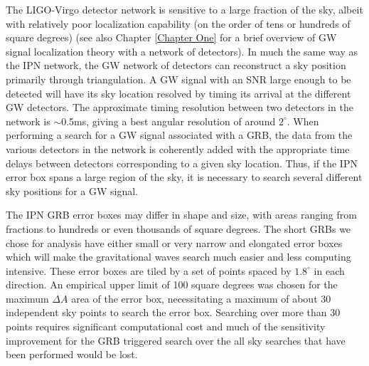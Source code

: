 The LIGO-Virgo detector network \cite{Abbott:2007kv, Abadie:2010px, virgostatus} is sensitive to a large fraction of the sky, albeit with relatively poor localization capability (on the order of tens or hundreds of square degrees)
\cite{Fairhurst:2010is} (see also Chapter \ref{Chapter One} for a brief overview of GW signal localization theory with a network of detectors). In much the same way as the IPN network, the GW network of detectors can reconstruct a sky position primarily through triangulation. A GW signal with an SNR large enough to be detected will have its sky location resolved by timing its arrival at the different GW detectors.  The approximate timing resolution between two detectors in the network is $\sim$0.5ms, giving a best angular resolution of around $2^\circ$.  When performing a search for a GW signal associated with a GRB, the data from the various detectors in the network is coherently added with the appropriate time delays between detectors corresponding to a given sky location.  Thus, if the IPN error box spans a large region of the sky, it is necessary to search several different sky positions for a GW signal.

The IPN GRB error boxes may differ in shape and size, with areas ranging from fractions to hundreds or even thousands of square degrees. The short GRBs we chose for analysis have either small or very narrow and elongated error boxes which will make the gravitational waves search much easier and less computing intensive.  These error boxes are tiled by a set of points spaced by $1.8^{\circ}$ in each direction.  An empirical upper limit of 100 square degrees was chosen for the maximum $\Delta A$ area of the error box, necessitating a maximum of about 30 independent sky points to search the error box.  Searching over more than 30 points requires significant computational cost and much of the sensitivity improvement for the GRB triggered search over the all sky searches that have been performed would be lost.

